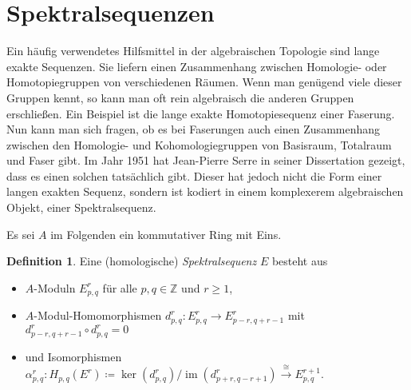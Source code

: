 \documentclass[11pt, a4paper, german]{article}
\theoremstyle{definition}
\newtheorem{defn}[lem]{Definition}
\theoremstyle{remark}
\newcommand{\Z}{\mathbb{Z}} %
\DeclareMathOperator{\im}{im} %
\begin{document}
\section{Spektralsequenzen}

Ein häufig verwendetes Hilfsmittel in der algebraischen Topologie sind lange exakte Sequenzen.
Sie liefern einen Zusammenhang zwischen Homologie- oder Homotopiegruppen von verschiedenen Räumen.
Wenn man genügend viele dieser Gruppen kennt, so kann man oft rein algebraisch die anderen Gruppen erschließen.
Ein Beispiel ist die lange exakte Homotopiesequenz einer Faserung.
Nun kann man sich fragen, ob es bei Faserungen auch einen Zusammenhang zwischen den Homologie- und Kohomologiegruppen von Basisraum, Totalraum und Faser gibt.
Im Jahr 1951 hat Jean-Pierre Serre in seiner Dissertation \cite{serre:thesis} gezeigt, dass es einen solchen tatsächlich gibt.
Dieser hat jedoch nicht die Form einer langen exakten Sequenz, sondern ist kodiert in einem komplexerem algebraischen Objekt, einer Spektralsequenz.

Es sei $A$ im Folgenden ein kommutativer Ring mit Eins.

\begin{defn}
  Eine (homologische) \emph{Spektralsequenz} $E$ besteht aus
  \begin{itemize}
    \item $A$-Moduln $E^r_{p,q}$ für alle $p, q \in \Z$ und $r \geq 1$,
    \item $A$-Modul-Homomorphismen $d^r_{p,q} : E^r_{p,q} \to E^r_{p-r,q+r-1}$ mit $d^r_{p-r,q+r-1} \circ d^r_{p,q} = 0$
    \item und Isomorphismen $\alpha^r_{p,q} : H_{p,q}(E^r) \!\coloneqq\! \ker(d ^r_{p,q}) / \im(d^r_{p+r,q-r+1}) \xrightarrow{\cong} E^{r+1}_{p,q}$.
  \end{itemize}
\end{defn}
\end{document}
